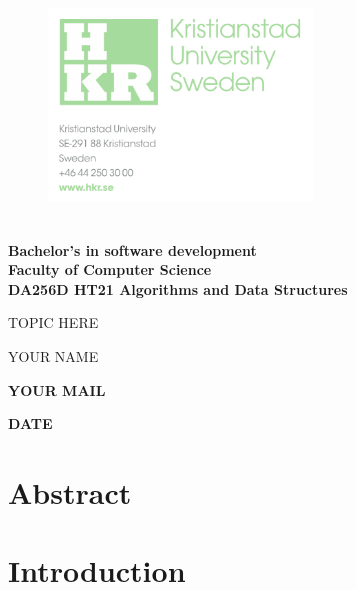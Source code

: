 \documentclass{article}
\begin{document}
	
	\begin{figure}[h!]

			\includegraphics[width=7cm]{images/hkr.png}
			\label{title}
	   \endminipage
		\endminipage
	\end{figure}
	
	\vspace{0.8cm}
	\Large

	\textbf{\\
	Bachelor’s in software development\\
	Faculty of Computer Science\\
	DA256D HT21 Algorithms and Data Structures}
	\begin{center}
	\vspace{3cm}
	\Huge
	
	TOPIC HERE
	
	\vspace{2cm}
	\LARGE
	YOUR NAME
	
	\vspace{0.4cm}	
	\large
	\textbf{YOUR MAIL}		\vspace{0.9cm}	

    \textbf{DATE}
	\end{center}
	
\thispagestyle{empty}       %

\newpage
	





\tableofcontents
\large

\thispagestyle{empty}        %


\newpage 

\section*{Abstract}


\newpage
\section{Introduction}
\vspace{1cm}
\end{document}
